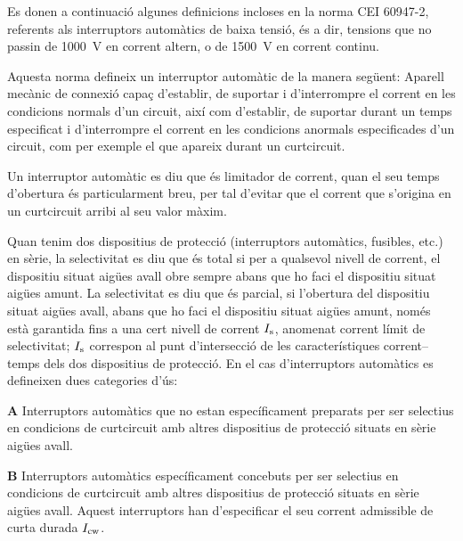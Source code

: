 Es donen a continuació algunes definicions incloses en la norma CEI 60947-2, referents als interruptors automàtics de baixa tensió, és a dir, tensions que no passin de \SI{1000}{V} en corrent altern, o de \SI{1500}{V} en corrent continu.

Aquesta norma defineix un interruptor automàtic de la manera següent: Aparell mecànic de connexió capaç d'establir, de suportar i d'interrompre el corrent en les condicions normals d'un circuit, així com d'establir, de suportar durant un temps especificat i  d'interrompre el corrent en les condicions anormals especificades d'un circuit, com per exemple el que apareix durant un curtcircuit.

Un interruptor automàtic es diu que és limitador de corrent, quan el seu temps d'obertura és particularment breu, per tal d'evitar que el corrent que s'origina en un curtcircuit arribi al seu valor màxim.

Quan tenim dos  dispositius de protecció (interruptors automàtics, fusibles, etc.) en sèrie, la selectivitat es diu que és total si per a qualsevol nivell de corrent, el dispositiu situat aigües avall obre sempre abans que ho faci el dispositiu situat aigües amunt. La selectivitat es diu que és parcial, si l'obertura del dispositiu situat aigües avall, abans que ho faci el dispositiu situat aigües amunt, només està garantida fins a una cert nivell de corrent $I_\mathrm{s}$, anomenat corrent límit de selectivitat; $I_\mathrm{s}$ correspon al punt d'intersecció de les característiques corrent--temps dels dos dispositius de protecció. En el cas d'interruptors automàtics es defineixen dues categories d'ús:
 \begin{list}{}
   {\setlength{\labelwidth}{10mm} \setlength{\leftmargin}{10mm} \setlength{\labelsep}{2mm}}
   \item[\textbf{A}] Interruptors automàtics que no estan específicament preparats per ser selectius en condicions de curtcircuit amb altres dispositius de protecció situats en sèrie  aigües avall.
   \item[\textbf{B}] Interruptors automàtics específicament concebuts per ser selectius en condicions de curtcircuit amb altres dispositius de protecció situats en sèrie  aigües avall. Aquest interruptors han d'especificar el seu corrent admissible de curta durada $I_\mathrm{cw}$.
\end{list}

